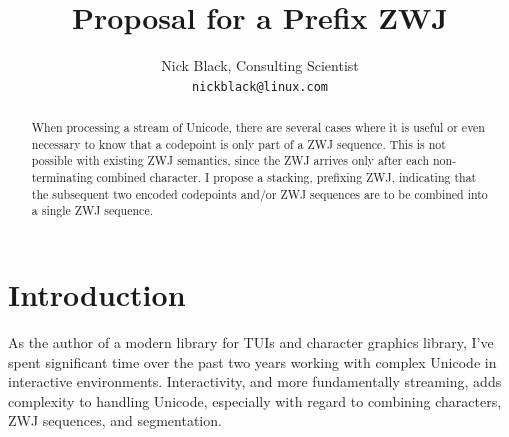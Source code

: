 \documentclass[letterpaper,10pt]{article}
\title{Proposal for a Prefix ZWJ}
\author{Nick Black, Consulting Scientist\\
\texttt{nickblack@linux.com}
}
\begin{document}
%
\maketitle
\date{}
\vspace{1in}
\begin{abstract}
When processing a stream of Unicode, there are several cases where it
is useful or even necessary to know that a codepoint is only part of a
ZWJ sequence. This is not possible with existing ZWJ semantics, since
the ZWJ arrives only after each non-terminating combined character. I
propose a stacking, prefixing ZWJ, indicating that the subsequent two
encoded codepoints and/or ZWJ sequences are to be combined into a single
ZWJ sequence.
\end{abstract}
\thispagestyle{empty}

\section{Introduction}
As the author of a modern library for TUIs and character graphics\cite{notcurses}
library, I've spent significant time over the past two years working with
complex Unicode in interactive environments. Interactivity, and more
fundamentally streaming, adds complexity to handling Unicode, especially
with regard to combining characters, ZWJ sequences\cite{zwjseqs}, and
segmentation\cite{segmentation}.


\printbibliography
{}
\cleardoublepage
\end{document}
